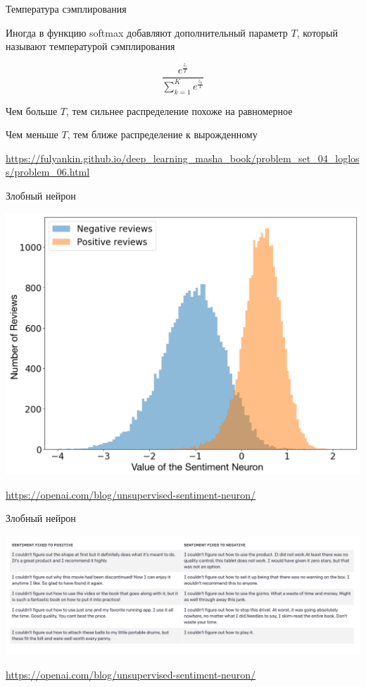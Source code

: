 \documentclass[notes,12pt, aspectratio=169]{beamer}
\newenvironment{wideitemize}{\itemize\addtolength{\itemsep}{10pt}}{\enditemize}
\begin{document}
\begin{frame}{Температура сэмплирования}
	\begin{wideitemize}
		\item  Иногда в функцию softmax добавляют дополнительный параметр $T$, который называют температурой сэмплирования
		
		\[ \frac{e^{\tfrac{z_i}{T}}}{ \sum_{k=1}^K e^{\tfrac{z_k}{T}}}	\]
		
		\item Чем больше $T$, тем сильнее распределение похоже на равномерное 
		
		\item Чем меньше $T$, тем ближе распределение к вырожденному 
	\end{wideitemize}

	\vfill 
\footnotesize 
\color{blue} \url{https://fulyankin.github.io/deep_learning_masha_book/problem_set_04_logloss/problem_06.html} 
\end{frame}


\begin{frame}{Злобный нейрон}
	\begin{center}
		\includegraphics[width=.6\linewidth]{sent_neuron.png}
	\end{center}
	\vfill 
	\footnotesize 
	\color{blue} \url{https://openai.com/blog/unsupervised-sentiment-neuron/} 
\end{frame}


\begin{frame}{Злобный нейрон}
	\begin{center}
		\includegraphics[width=.99\linewidth]{sent-text.png}
	\end{center}
	\vfill 
	\footnotesize 
	\color{blue} \url{https://openai.com/blog/unsupervised-sentiment-neuron/} 
\end{frame}
\end{document}
